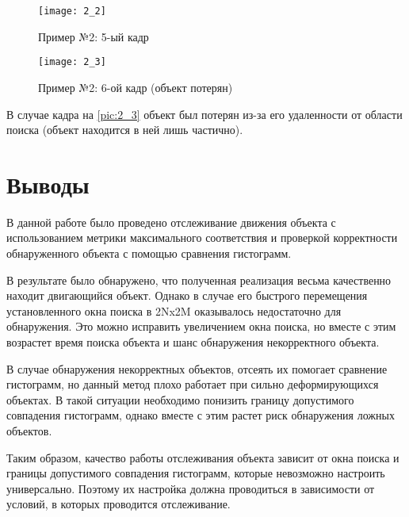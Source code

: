 \begin{figure}[H]
	\centering
	\texttt{[image: 2\_2]}
	\caption{Пример №2: 5-ый кадр}
	\label{pic:2_2}
\end{figure}

\begin{figure}[H]
	\centering
	\texttt{[image: 2\_3]}
	\caption{Пример №2: 6-ой кадр (объект потерян)}
	\label{pic:2_3}
\end{figure}

В случае кадра на \vref{pic:2_3} объект был потерян из-за его удаленности от области поиска (объект находится в ней лишь частично).

\section{Выводы}

В данной работе было проведено отслеживание движения объекта с использованием метрики максимального соответствия и проверкой корректности обнаруженного объекта с помощью сравнения гистограмм.

В результате было обнаружено, что полученная реализация весьма качественно находит двигающийся объект. Однако в случае его быстрого перемещения установленного окна поиска в 2Nx2M оказывалось недостаточно для обнаружения. Это можно исправить увеличением окна поиска, но вместе с этим возрастет время поиска объекта и шанс обнаружения некорректного объекта.

В случае обнаружения некорректных объектов, отсеять их помогает сравнение гистограмм, но данный метод плохо работает при сильно деформирующихся объектах. В такой ситуации необходимо понизить границу допустимого совпадения гистограмм, однако вместе с этим растет риск обнаружения ложных объектов.

Таким образом, качество работы отслеживания объекта зависит от окна поиска и границы допустимого совпадения гистограмм, которые невозможно настроить универсально. Поэтому их настройка должна проводиться в зависимости от условий, в которых проводится отслеживание.